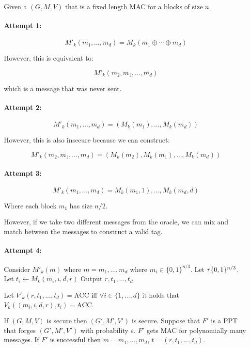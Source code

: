\documentclass{idc_msc}
\DeclareMathOperator*{\xor}{\oplus}
\let\getsrandom\relax
\newcommand{\getsrandom}{\ensuremath{\overset{R}{\gets}}}
\begin{document}
Given a \((G,M,V)\) that is a fixed length MAC for a blocks of size \(n\).

\paragraph{Attempt 1:}

\[
  M'_k(m_1,\ldots,m_d) = M_k(m_1 \xor \cdots \xor m_d)
\]

However, this is equivalent to:

\[
  M'_k(m_2,m_1, \ldots, m_d)
\]

which is a message that was never sent.

\paragraph{Attempt 2:}

\[
  M'_k(m_1,\ldots,m_d) = (M_k(m_1), \ldots, M_k(m_d))
\]

However, this is also insecure because we can construct:

\[
  M'_k(m_2, m_1,\ldots,m_d) = (M_k(m_2), M_k(m_1), \ldots, M_k(m_d))
\]

\paragraph{Attempt 3:}

\[
  M'_k(m_1, \ldots, m_d) = M_k(m_1, 1), \ldots, M_k(m_d, d)
\]

Where each block \(m_1\) has size \(n/2\).

However, if we take two different messages from the oracle, we can mix and match between the messages to construct a valid tag.

\paragraph{Attempt 4:}

Consider \(M'_k(m)\) where \(m = m_1, \ldots, m_d\) where \(m_i \in \{0,1\}^{n/3}\).
Let \(r \getsrandom \{0, 1\}^{n/3}\).
Let \(t_i \gets M_k(m_i, i, d, r)\)
Output \(r,t_1, \ldots, t_d\)

Let \(V'_k(r,t_1, \ldots, t_d) = \mathrm{ACC}\) iff \(\forall i \in \{1, \ldots, d\}\) it holds that \(V_k((m_i, i, d, r), t_i) = \mathrm{ACC}\).

If \((G, M, V)\) is secure then \((G', M', V')\) is secure.
Suppose that \(F'\) is a PPT that forges \((G', M', V')\) with probability \(\varepsilon\).
\(F'\) gets MAC for polynomially many messages.
If \(F'\) is successful then \(m=m_1, \ldots, m_d\), \(t= (r, t_1, \ldots, t_d)\).
\end{document}
